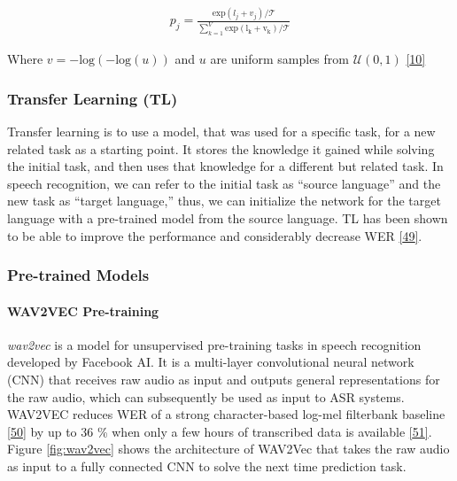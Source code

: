 \documentclass[
  a4paper,
]{article}
\begin{document}
\begin{align}
p_j = \frac{\mathrm{exp}(l_j + v_j)/\mathcal{T}}{\sum_{k=1}^V \mathrm{exp(l_k + v_k)/\mathcal{T}}}
\end{align}

Where \(v = -\mathrm{log}(-\mathrm{log}(u))\) and \(u\) are uniform
samples from \(\mathcal{U}(0,1)\)
\protect\hyperlink{ref-baevski2020vqwav2vec}{{[}10{]}}

\hypertarget{transfer-learning-tl}{%
\subsubsection{Transfer Learning (TL)}\label{transfer-learning-tl}}

Transfer learning is to use a model, that was used for a specific task,
for a new related task as a starting point. It stores the knowledge it
gained while solving the initial task, and then uses that knowledge for
a different but related task. In speech recognition, we can refer to the
initial task as ``source language'' and the new task as ``target
language,'' thus, we can initialize the network for the target language
with a pre-trained model from the source language. TL has been shown to
be able to improve the performance and considerably decrease WER
\protect\hyperlink{ref-joshi2020transfer}{{[}49{]}}.

\hypertarget{pre-trained-models}{%
\subsubsection{Pre-trained Models}\label{pre-trained-models}}

\hypertarget{wav2vec-pre-training}{%
\paragraph{\texorpdfstring{WAV2VEC Pre-training
\newline \newline}{WAV2VEC Pre-training }}\label{wav2vec-pre-training}}

\emph{wav2vec} is a model for unsupervised pre-training tasks in speech
recognition developed by Facebook AI. It is a multi-layer convolutional
neural network (CNN) that receives raw audio as input and outputs
general representations for the raw audio, which can subsequently be
used as input to ASR systems. WAV2VEC reduces WER of a strong
character-based log-mel filterbank baseline
\protect\hyperlink{ref-m2014choice}{{[}50{]}} by up to 36 \% when only a
few hours of transcribed data is available
\protect\hyperlink{ref-schneider2019wav2vec}{{[}51{]}}. Figure
\ref{fig:wav2vec} shows the architecture of WAV2Vec that takes the raw
audio as input to a fully connected CNN to solve the next time
prediction task.
\end{document}
